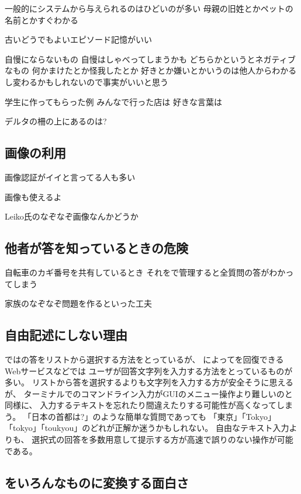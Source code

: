 \documentclass[twoside]{wiss}
\begin{document}
一般的にシステムから与えられるのはひどいのが多い
母親の旧姓とかペットの名前とかすぐわかる

古いどうでもよいエピソード記憶がいい

自慢にならないもの
  自慢はしゃべってしまうかも
どちらかというとネガティブなもの
  何かまけたとか怪我したとか
好きとか嫌いとかいうのは他人からわかるし変わるかもしれないので事実がいいと思う

学生に作ってもらった例
  みんなで行った店は
  好きな言葉は

デルタの柵の上にあるのは?


\subsection{画像の利用}

画像認証がイイと言ってる人も多い

画像も使えるよ

Leiko氏のなぞなぞ画像なんかどうか

\subsection{他者が答を知っているときの危険}

自転車のカギ番号を共有しているとき
それを{\EP}で管理すると全質問の答がわかってしまう

家族のなぞなぞ問題を作るといった工夫

\subsection{自由記述にしない理由}

{\EP}では{\SQ}の答をリストから選択する方法をとっているが、
{\SQ}によって{\PW}を回復できるWebサービスなどでは
ユーザが回答文字列を入力する方法をとっているものが多い。
リストから答を選択するよりも文字列を入力する方が安全そうに思えるが、
ターミナルでのコマンドライン入力がGUIのメニュー操作より難しいのと同様に、
入力するテキストを忘れたり間違えたりする可能性が高くなってしまう。
「日本の首都は?」のような簡単な質問であっても
「東京」「Tokyo」「tokyo」「toukyou」のどれが正解か迷うかもしれない。
自由なテキスト入力よりも、
選択式の回答を多数用意して提示する方が高速で誤りのない操作が可能である。


\subsection{{\EM}をいろんなものに変換する面白さ}
\end{document}
